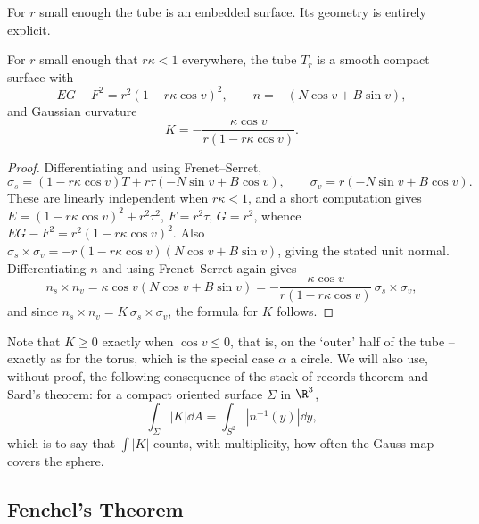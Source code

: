 For $r$ small enough the tube is an embedded surface. Its geometry is entirely explicit.

\begin{lemma}
    For $r$ small enough that $r\kappa < 1$ everywhere, the tube $T_r$ is a smooth compact surface with
    $$
    EG - F^2 = r^2\left(1 - r\kappa\cos v\right)^2, \qquad n = -\left(N\cos v + B \sin v\right),
    $$
    and Gaussian curvature
    $$
    K = -\frac{\kappa\cos v}{r\left(1-r\kappa\cos v\right)}.
    $$
\end{lemma}
\begin{proof}
    Differentiating and using Frenet--Serret,
    $$
    \sigma_s = \left(1 - r\kappa\cos v\right)T + r\tau\left(-N\sin v + B\cos v\right), \qquad \sigma_v = r\left(-N\sin v + B\cos v\right).
    $$
    These are linearly independent when $r\kappa < 1$, and a short computation gives $E = (1-r\kappa\cos v)^2 + r^2\tau^2$, $F = r^2\tau$, $G = r^2$, whence $EG - F^2 = r^2(1-r\kappa\cos v)^2$. Also $\sigma_s\times\sigma_v = -r(1-r\kappa\cos v)(N\cos v + B \sin v)$, giving the stated unit normal. Differentiating $n$ and using Frenet--Serret again gives
    $$
    n_s \times n_v = \kappa\cos v\left(N\cos v + B\sin v\right) = -\frac{\kappa\cos v}{r(1-r\kappa\cos v)}\,\sigma_s\times\sigma_v,
    $$
    and since $n_s\times n_v = K\,\sigma_s\times\sigma_v$, the formula for $K$ follows.
\end{proof}

Note that $K \geq 0$ exactly when $\cos v \leq 0$, that is, on the `outer' half of the tube -- exactly as for the torus, which is the special case $\alpha$ a circle. We will also use, without proof, the following consequence of the stack of records theorem and Sard's theorem: for a compact oriented surface $\Sigma$ in $\R^3$,
$$
\int_\Sigma |K| \dd A = \int_{S^2}\left|n^{-1}(y)\right|\dd y,
$$
which is to say that $\int|K|$ counts, with multiplicity, how often the Gauss map covers the sphere.

\subsection{Fenchel's Theorem}

